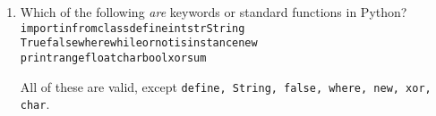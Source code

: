 \begin{enumerate}
\item Which of the following \textit{are} keywords or standard functions in Python?\\
\texttt{import\hspace{10mm}in\hspace{10mm}from\hspace{10mm}class\hspace{10mm}define\hspace{10mm}int\hspace{10mm}str\hspace{10mm}String}\\
\texttt{True\hspace{9mm}false\hspace{9mm}where\hspace{9mm}while\hspace{9mm}or\hspace{9mm}not\hspace{9mm}isinstance\hspace{9mm}new}\\
\texttt{print\hspace{13mm}range\hspace{13mm}float\hspace{13mm}char\hspace{13mm}bool\hspace{13mm}xor\hspace{13mm}sum}\\

\begin{answer}
All of these are valid, except \texttt{define, String, false, where, new, xor, char}.
\end{answer}
\end{enumerate}



